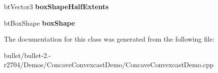 \begin{DoxyCompactItemize}
\item 
\hypertarget{classbt_convexcast_batch_a205e46f4d567ff32b318df393fa7f376}{bt\+Vector3 {\bfseries box\+Shape\+Half\+Extents}}\label{classbt_convexcast_batch_a205e46f4d567ff32b318df393fa7f376}

\item 
\hypertarget{classbt_convexcast_batch_aa912e0cad14b051af05d269008bad453}{bt\+Box\+Shape {\bfseries box\+Shape}}\label{classbt_convexcast_batch_aa912e0cad14b051af05d269008bad453}

\end{DoxyCompactItemize}


The documentation for this class was generated from the following file\+:\begin{DoxyCompactItemize}
\item 
bullet/bullet-\/2.-\/r2704/\+Demos/\+Concave\+Convexcast\+Demo/Concave\+Convexcast\+Demo.\+cpp\end{DoxyCompactItemize}
